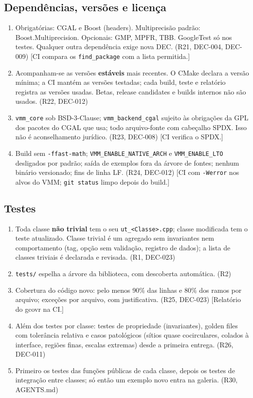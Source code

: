 \subsection{Dependências, versões e licença}

\begin{enumerate}
  \item Obrigatórias: CGAL e Boost (headers). Multiprecisão padrão: Boost.Multiprecision. Opcionais: GMP, MPFR,
        TBB. GoogleTest só nos testes. Qualquer outra dependência exige nova DEC. (R21, DEC-004, DEC-009)
        [CI compara os \texttt{find\_package} com a lista permitida.]
  \item Acompanham-se as versões \textbf{estáveis} mais recentes. O CMake declara a versão mínima; a CI mantém as
        versões testadas; cada build, teste e relatório registra as versões usadas. Betas, release candidates e
        builds internos não são usados. (R22, DEC-012)
  \item \texttt{vmm\_core} sob BSD-3-Clause; \texttt{vmm\_backend\_cgal} sujeito às obrigações da GPL dos pacotes
        do CGAL que usa; todo arquivo-fonte com cabeçalho SPDX. Isso não é aconselhamento jurídico. (R23, DEC-008)
        [CI verifica o SPDX.]
  \item Build sem \texttt{-ffast-math}; \texttt{VMM\_ENABLE\_NATIVE\_ARCH} e \texttt{VMM\_ENABLE\_LTO} desligados
        por padrão; saída de exemplos fora da árvore de fontes; nenhum binário versionado; fins de linha LF.
        (R24, DEC-012)
        [CI com \texttt{-Werror} nos alvos do VMM; \texttt{git status} limpo depois do build.]
\end{enumerate}

\subsection{Testes}

\begin{enumerate}
  \item Toda classe \textbf{não trivial} tem o seu \texttt{ut\_<Classe>.cpp}; classe modificada tem o teste
        atualizado. Classe trivial é um agregado sem invariantes nem comportamento (tag, opção sem validação,
        registro de dados); a lista de classes triviais é declarada e revisada. (R1, DEC-023)
  \item \texttt{tests/} espelha a árvore da biblioteca, com descoberta automática. (R2)
  \item Cobertura do código novo: pelo menos 90\% das linhas e 80\% dos ramos por arquivo; exceções por arquivo,
        com justificativa. (R25, DEC-023)
        [Relatório do gcovr na CI.]
  \item Além dos testes por classe: testes de propriedade (invariantes), golden files com tolerância relativa e
        casos patológicos (sítios quase cocirculares, colados à interface, regiões finas, escalas extremas)
        desde a primeira entrega. (R26, DEC-011)
  \item Primeiro os testes das funções públicas de cada classe, depois os testes de integração entre classes;
        só então um exemplo novo entra na galeria. (R30, AGENTS.md)
\end{enumerate}

